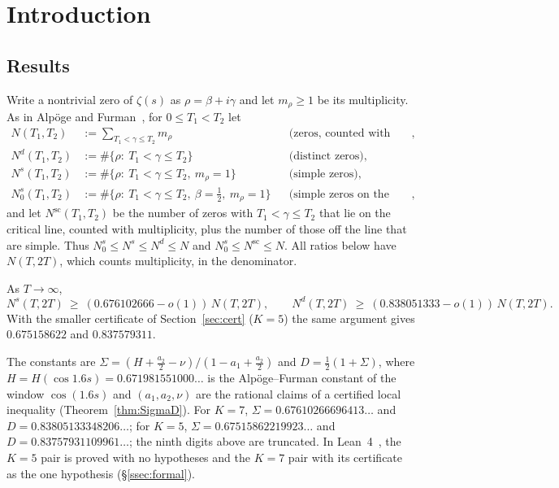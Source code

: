 \section{Introduction}\label{sec:intro}

\subsection{Results}\label{ssec:results}
Write a nontrivial zero of $\zeta(s)$ as $\rho=\beta+i\gamma$ and let $m_\rho\ge1$ be its multiplicity. As in Alp\"oge and Furman~\cite{AF}, for
$0\le T_1<T_2$ let
\begin{align*}
N(T_1,T_2)&:=\sum_{T_1<\gamma\le T_2}m_\rho &&\text{(zeros, counted with multiplicity)},\\
N^d(T_1,T_2)&:=\#\{\rho:\ T_1<\gamma\le T_2\} &&\text{(distinct zeros)},\\
N^s(T_1,T_2)&:=\#\{\rho:\ T_1<\gamma\le T_2,\ m_\rho=1\} &&\text{(simple zeros)},\\
N_0^s(T_1,T_2)&:=\#\{\rho:\ T_1<\gamma\le T_2,\ \beta=\tfrac12,\ m_\rho=1\} &&\text{(simple zeros on the critical line)},
\end{align*}
and let $N^{\mathrm{sc}}(T_1,T_2)$ be the number of zeros with $T_1<\gamma\le T_2$ that lie on the critical line, counted with multiplicity, plus
the number of those off the line that are simple. Thus $N_0^s\le N^s\le N^d\le N$ and $N_0^s\le N^{\mathrm{sc}}\le N$. All ratios below have
$N(T,2T)$, which counts multiplicity, in the denominator.

\begin{theorem}\label{thm:main}
As $T\to\infty$,
\[
N^s(T,2T)\ \ge\ (0.676102666-o(1))\,N(T,2T),\qquad N^d(T,2T)\ \ge\ (0.838051333-o(1))\,N(T,2T).
\]
With the smaller certificate of Section~\ref{sec:cert} \textup{(}$K=5$\textup{)} the same argument gives $0.675158622$ and $0.837579311$.
\end{theorem}

The constants are $\Sigma=(H+\frac{a_2}2-\nu)/(1-a_1+\frac{a_2}2)$ and $D=\frac12(1+\Sigma)$, where $H=H(\cos1.6s)=0.671981551000\ldots$ is the
Alp\"oge--Furman constant of the window $\cos(1.6s)$ and $(a_1,a_2,\nu)$ are the rational claims of a certified local inequality
(Theorem~\ref{thm:SigmaD}). For $K=7$, $\Sigma=0.67610266696413\ldots$ and $D=0.83805133348206\ldots$; for $K=5$, $\Sigma=0.67515862219923\ldots$
and $D=0.83757931109961\ldots$; the ninth digits above are truncated. In Lean~4~\cite{Lean4}, the $K=5$ pair is proved with no hypotheses and the
$K=7$ pair with its certificate as the one hypothesis (\S\ref{ssec:formal}).

